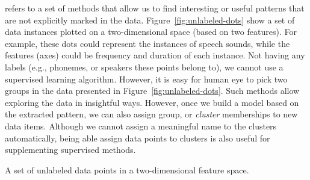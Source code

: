  refers to a set of methods
that allow us to find interesting or useful patterns
that are not explicitly marked in the data.
Figure~\ref{fig:unlabeled-dots} show a set of data instances
plotted on a two-dimensional space (based on two features).
For example, these dots could represent the instances of speech sounds,
while the features (axes) could be frequency and duration of each instance.
Not having any labels (e.g., phonemes, or speakers these points belong to),
we cannot use a supervised learning algorithm.
However, it is easy for human eye to pick two groups in the data presented
in Figure~\ref{fig:unlabeled-dots}.
Such methods allow exploring the data in insightful ways.
However, once we build a model based on the extracted pattern,
we can also assign group, or \emph{cluster} memberships to new data items.
Although we cannot assign a meaningful name to the clusters automatically, 
being able assign data points to clusters is also useful
for supplementing supervised methods.
\begin{marginfigure}
  \centering
      \caption{\label{fig:unlabeled-dots}
        A set of unlabeled data points in a two-dimensional feature space.
      }
\end{marginfigure}

